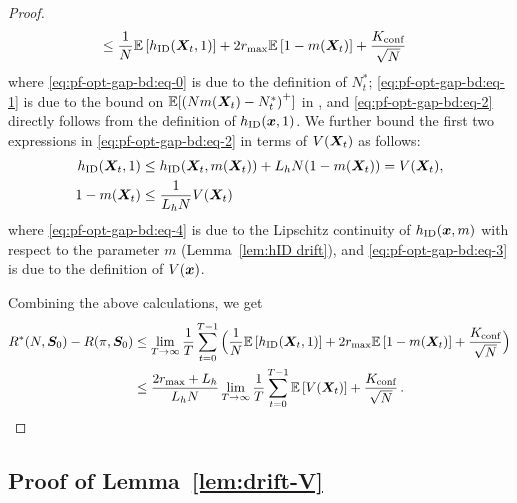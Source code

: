 \begin{proof}
\begin{align}
        \label{eq:pf-opt-gap-bd:eq-2}
        &\leq \frac{1}{N}\mathbb{E}\left[h_{\textnormal{ID}}({\bm{X}}_{t},1)\right] + 2r_{\max} \mathbb{E}\left[1-m({\bm{X}}_{t})\right] + \frac{K_{\text{conf}}}{\sqrt{N}}
    \end{align}
    where \eqref{eq:pf-opt-gap-bd:eq-0} is due to the definition of $N_t^*$; \eqref{eq:pf-opt-gap-bd:eq-1} is due to the bound on $\mathbb{E}[\left(Nm({\bm{X}}_t) - N_t^* \right)^+]$ in , and \eqref{eq:pf-opt-gap-bd:eq-2} directly follows from the definition of $h_{\textnormal{ID}}(\bm{x}, 1)$. 
    We further bound the first two expressions in \eqref{eq:pf-opt-gap-bd:eq-2} in terms of $V({\bm{X}}_t)$ as follows: 
    \begin{align}
        \label{eq:pf-opt-gap-bd:eq-4}
        h_{\textnormal{ID}}({\bm{X}}_{t},1)&\leq h_{\textnormal{ID}}({\bm{X}}_{t},m({\bm{X}}_{t}))+L_h N (1-m({\bm{X}}_{t}))=V({\bm{X}}_{t}), \\
        \label{eq:pf-opt-gap-bd:eq-3}
        1-m({\bm{X}}_{t}) &\leq \frac{1}{L_h N}V({\bm{X}}_{t}) 
    \end{align}
    where \eqref{eq:pf-opt-gap-bd:eq-4} is due to the Lipschitz continuity of $h_{\textnormal{ID}}(\bm{x}, m)$ with respect to the parameter $m$ (Lemma~\ref{lem:hID drift}), and \eqref{eq:pf-opt-gap-bd:eq-3} is due to the definition of $V(\bm{x})$.  

    
    Combining the above calculations, we get
    \begin{align*}
       R^*(N,\bm{S}_0) - R(\pi,\bm{S}_0)
       &\leq  \lim_{T\to\infty} \frac{1}{T} \sum_{t=0}^{T-1} \Big(\frac{1}{N}\mathbb{E}\left[h_{\textnormal{ID}}({\bm{X}}_{t},1)\right] + 2r_{\max} \mathbb{E}\left[1-m({\bm{X}}_{t})\right] + \frac{K_{\text{conf}}}{\sqrt{N}}   \Big) \\
       &\leq \frac{2r_{\max} + L_h}{L_h N}\lim_{T\to\infty}\frac{1}{T}\sum_{t=0}^{T-1}\mathbb{E}\left[V({\bm{X}}_{t})\right] + \frac{K_{\text{conf}}}{\sqrt{N}}\,.
    \end{align*}
\end{proof}

\subsection{Proof of Lemma~\ref{lem:drift-V}}
\label{app:pf-lem:drift-V}

\driftV*

